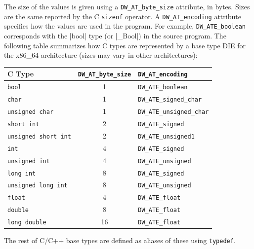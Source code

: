 The size of the values is given using a \verb|DW_AT_byte_size| attribute,
in bytes. Sizes are the same reported by the C \texttt{sizeof}
operator. A \verb|DW_AT_encoding| attribute specifies how the values are
used in the program. For example, \verb|DW_ATE_boolean|
corresponds with the \Mc|bool| type (or \Mc|_Bool|) in the
source program. The following table summarizes how C types are represented by
a base type DIE for the x86\_64 architecture (sizes may vary in other
architectures):

\begin{center}
  \begin{tabular}{lcl}
    \toprule
    C Type & \verb|DW_AT_byte_size| & \verb|DW_AT_encoding| \\
    \midrule
    \texttt{bool}               & 1 & \verb|DW_ATE_boolean| \\
    \texttt{char}               & 1 & \verb|DW_ATE_signed_char| \\
    \texttt{unsigned char}      & 1 & \verb|DW_ATE_unsigned_char| \\
    \texttt{short int}          & 2 & \verb|DW_ATE_signed| \\
    \texttt{unsigned short int} & 2 & \verb|DW_ATE_unsigned1| \\
    \texttt{int}                & 4 & \verb|DW_ATE_signed| \\
    \texttt{unsigned int}       & 4 & \verb|DW_ATE_unsigned| \\
    \texttt{long int}           & 8 & \verb|DW_ATE_signed| \\
    \texttt{unsigned long int}  & 8 & \verb|DW_ATE_unsigned| \\
    \texttt{float}              & 4 & \verb|DW_ATE_float| \\
    \texttt{double}             & 8 & \verb|DW_ATE_float| \\
    \texttt{long double}        & 16& \verb|DW_ATE_float| \\
    \bottomrule
  \end{tabular}
\end{center}

The rest of C/C++ base types are defined as aliases of these
using \texttt{typedef}.



